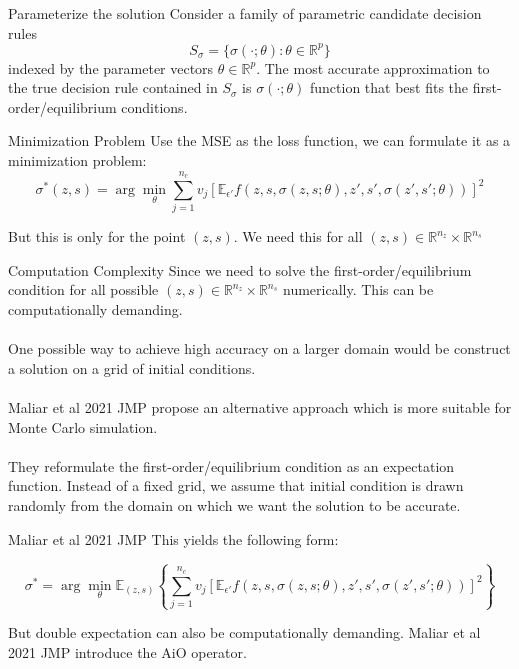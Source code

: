 \documentclass[aspectratio=169]{beamer} %
\begin{document}
\begin{frame}{Parameterize the solution}
    Consider a family of parametric candidate decision rules
    $$
    S_\sigma = \{\sigma(\cdot;\theta):\theta\in\mathbb{R}^p\}
    $$
    indexed by the parameter vectors $\theta\in\mathbb{R}^p$. The most accurate approximation to the true decision rule contained in $S_\sigma$ is $\sigma(\cdot;\theta)$ function that best fits the first-order/equilibrium conditions.
\end{frame}

\begin{frame}{Minimization Problem}
    Use the MSE as the loss function, we can formulate it as a minimization problem:
    $$
    \sigma^*(z,s) = \arg\min_\theta \sum_{j=1}^{n_c} v_j \left[\mathbb{E}_{\epsilon'} f(z,s,\sigma(z,s;\theta), z',s',\sigma(z',s';\theta))\right]^2
    $$

    But this is only for the point $(z,s)$. We need this for all $(z,s)\in\mathbb{R}^{n_z}\times\mathbb{R}^{n_s}$
\end{frame}

\begin{frame}{Computation Complexity}
Since we need to solve the first-order/equilibrium condition for all possible $(z,s)\in\mathbb{R}^{n_z}\times\mathbb{R}^{n_s}$ numerically. This can be computationally demanding.\\
\\
One possible way to achieve high accuracy on a larger domain would be construct a solution on a grid of initial conditions.\\
\\
Maliar et al 2021 JMP propose an alternative approach which is more suitable for Monte Carlo simulation.\\
\\
They reformulate the first-order/equilibrium condition as an expectation function. Instead of a fixed grid, we assume that initial condition is drawn randomly from the domain on which we want the solution to be accurate.
\end{frame}

\begin{frame}{Maliar et al 2021 JMP}
This yields the following form:

$$
    \sigma^* = \arg\min_\theta \mathbb{E}_{(z,s)}\left\{\sum_{j=1}^{n_c} v_j \left[\mathbb{E}_{\epsilon'} f(z,s,\sigma(z,s;\theta), z',s',\sigma(z',s';\theta))\right]^2\right\}
    $$

But double expectation can also be computationally demanding. Maliar et al 2021 JMP introduce the AiO operator. 

\end{frame}
\end{document}
